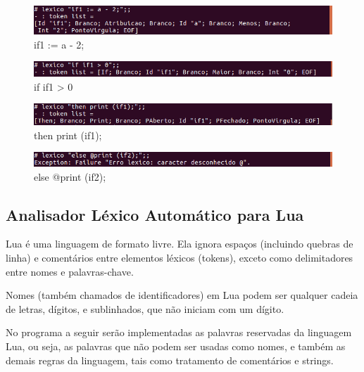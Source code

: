 \documentclass[12pt,a4paper]{report}
\begin{document}
\begin{figure}[!htb]
\centering
\includegraphics[scale=0.6]{Imagens/img5.png}
\caption{if1 := a - 2;}
\label{img5}
\end{figure}

\begin{figure}[!htb]
\centering
\includegraphics[scale=0.6]{Imagens/img6.png}
\caption{if if1 > 0}
\label{img6}
\end{figure}

\begin{figure}[!htb]
\centering
\includegraphics[scale=0.6]{Imagens/img7.png}
\caption{then print (if1);}
\label{img7}
\end{figure}

\begin{figure}[!htb]
\centering
\includegraphics[scale=0.6]{Imagens/img9.png}
\caption{else @print (if2);}
\label{img9}
\end{figure}


\subsection{Analisador Léxico Automático para Lua}

Lua é uma linguagem de formato livre. Ela ignora espaços (incluindo quebras de linha) e comentários entre elementos léxicos (tokens), exceto como delimitadores entre nomes e palavras-chave.

Nomes (também chamados de identificadores) em Lua podem ser qualquer cadeia de letras, dígitos, e sublinhados, que não iniciam com um dígito. 

No programa a seguir serão implementadas as palavras reservadas da linguagem Lua, ou seja, as palavras que não podem ser usadas como nomes, e também as demais regras da linguagem, tais como tratamento de comentários e strings. 


\end{document}
